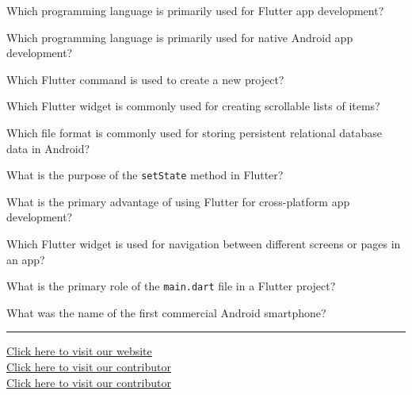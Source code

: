 \documentclass[11pt,a4paper]{article}
\begin{document}
\begin{parts}
  \item Which programming language is primarily used for Flutter app development?
  \item Which programming language is primarily used for native Android app development?
  \item Which Flutter command is used to create a new project?
  \item Which Flutter widget is commonly used for creating scrollable lists of items?
  \item Which file format is commonly used for storing persistent relational database data in Android?
  \item What is the purpose of the   \texttt{setState} method in Flutter?
  \item What is the primary advantage of using Flutter for cross-platform app development?
  \item Which Flutter widget is used for navigation between different screens or pages in an app?
  \item What is the primary role of the   \texttt{main.dart} file in a Flutter project?
  \item What was the name of the first commercial Android smartphone?
\end{parts}

\vfill
\rule{\linewidth}{0.4pt}

\begin{center}\small
\href{https://bhu-exam.vercel.app/}{Click here to visit our website}\\[4pt]\href{https://me-aryan.vercel.app/}{Click here to visit our contributor}\\[4pt]\href{https://quashan-me.vercel.app/}{Click here to visit our contributor}
\end{center}
\end{document}
